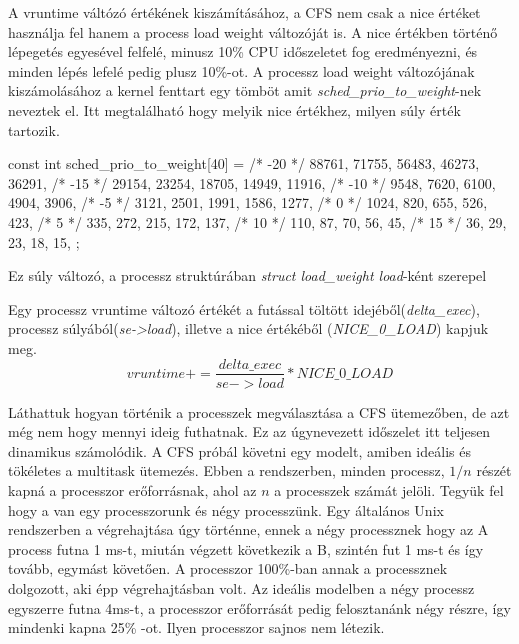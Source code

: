 A vruntime váltózó értékének kiszámításához, a CFS nem csak a nice értéket használja fel hanem a process load weight változóját is. A nice értékben történő lépegetés egyesével felfelé, minusz 10\% CPU időszeletet fog eredményezni, és minden lépés lefelé pedig plusz 10\%-ot. 
A processz load weight változójának kiszámolásához a kernel fenttart egy tömböt amit \textit{sched\_prio\_to\_weight}-nek neveztek el. Itt megtalálható hogy melyik nice értékhez, milyen súly érték tartozik.
\begin{cpp}
const int sched_prio_to_weight[40] = {
 /* -20 */     88761,     71755,     56483,     46273,     36291,
 /* -15 */     29154,     23254,     18705,     14949,     11916,
 /* -10 */      9548,      7620,      6100,      4904,      3906,
 /*  -5 */      3121,      2501,      1991,      1586,      1277,
 /*   0 */      1024,       820,       655,       526,       423,
 /*   5 */       335,       272,       215,       172,       137,
 /*  10 */       110,        87,        70,        56,        45,
 /*  15 */        36,        29,        23,        18,        15,
};
\end{cpp}

\noindent Ez súly változó, a processz struktúrában \textit{struct load\_weight load}-ként szerepel

Egy processz vruntime változó értékét a futással töltött idejéből(\textit{delta\_exec}), processz súlyából(\textit{se->load}), illetve a nice értékéből (\textit{NICE\_0\_LOAD}) kapjuk meg.
\begin{equation}
vruntime += \frac{delta\_exec}{se->load}*NICE\_0\_LOAD
\end{equation}

Láthattuk hogyan történik a processzek megválasztása a CFS ütemezőben, de azt még nem hogy mennyi ideig futhatnak.
Ez az úgynevezett időszelet itt teljesen dinamikus számolódik.
A CFS próbál követni egy modelt, amiben ideális és tökéletes a multitask ütemezés. Ebben a rendszerben, minden processz, $1/n$ részét kapná a processzor erőforrásnak, ahol az $n$ a processzek számát jelöli. 
Tegyük fel hogy a van egy processzorunk és négy processzünk.
Egy általános Unix rendszerben a végrehajtása úgy történne, ennek a négy processznek hogy az A process futna 1 ms-t, miután végzett következik a B, szintén fut 1 ms-t és így tovább, egymást követően. A processzor 100\%-ban annak a processznek dolgozott, aki épp végrehajtásban volt.
Az ideális modelben a négy processz egyszerre futna 4ms-t, a processzor erőforrását pedig felosztanánk négy részre, így mindenki kapna 25\% -ot. Ilyen processzor sajnos nem létezik.

